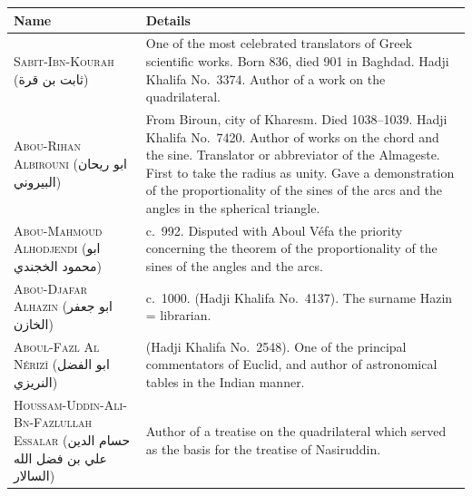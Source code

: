 \documentclass[11pt,a4paper]{article}
\theoremstyle{plain}
\theoremstyle{definition}
\theoremstyle{remark}
\newcommand{\ar}[1]{{\arabicfont\beginR #1\endR}}
\begin{document}
\begin{center}

\begin{longtable}{lp{9cm}}

\toprule

\textbf{Name} & \textbf{Details} \\

\midrule

\endhead



\textsc{Sabit-Ibn-Kourah} (\ar{ثابت بن قرة}) & One of the most celebrated translators of Greek scientific works. Born 836, died 901 in Baghdad. Hadji Khalifa No.~3374. Author of a work on the quadrilateral. \\

\addlinespace[0.2cm]



\textsc{Abou-Rihan Albirouni} (\ar{ابو ريحان البيروني}) & From Biroun, city of Kharesm. Died 1038--1039. Hadji Khalifa No.~7420. Author of works on the chord and the sine. Translator or abbreviator of the Almageste. First to take the radius as unity. Gave a demonstration of the proportionality of the sines of the arcs and the angles in the spherical triangle. \\

\addlinespace[0.2cm]



\textsc{Abou-Mahmoud Alhodjendi} (\ar{ابو محمود الخجندي}) & c.~992. Disputed with Aboul Véfa the priority concerning the theorem of the proportionality of the sines of the angles and the arcs. \\

\addlinespace[0.2cm]



\textsc{Abou-Djafar Alhazin} (\ar{ابو جعفر الخازن}) & c.~1000. (Hadji Khalifa No.~4137). The surname Hazin = librarian. \\

\addlinespace[0.2cm]



\textsc{Aboul-Fazl Al Nérizî} (\ar{ابو الفضل النريزي}) & (Hadji Khalifa No.~2548). One of the principal commentators of Euclid, and author of astronomical tables in the Indian manner. \\

\addlinespace[0.2cm]



\textsc{Houssam-Uddin-Ali-Bn-Fazlullah Essalar} (\ar{حسام الدين علي بن فضل الله السالار}) & Author of a treatise on the quadrilateral which served as the basis for the treatise of Nasiruddin. \\


\end{longtable}
\end{center}
\end{document}
